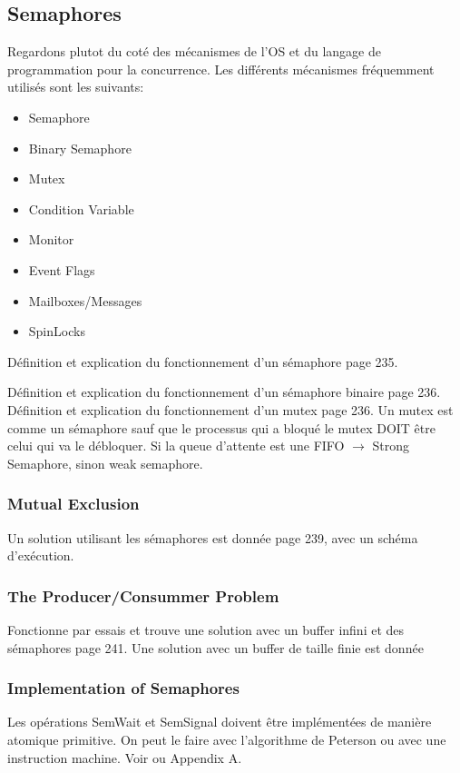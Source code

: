 \subsection{Semaphores}
Regardons plutot du coté des mécanismes de l'OS et du langage de programmation pour la concurrence.
Les différents mécanismes fréquemment utilisés sont les suivants:
\begin{itemize}
  \item Semaphore
  \item Binary Semaphore
  \item Mutex
  \item Condition Variable
  \item Monitor
  \item Event Flags
  \item Mailboxes/Messages
  \item SpinLocks
\end{itemize}
Définition et explication du fonctionnement d'un sémaphore page 235.

Définition et explication du fonctionnement d'un sémaphore binaire page 236.
Définition et explication du fonctionnement d'un mutex page 236.
Un mutex est comme un sémaphore sauf que le processus qui a bloqué le mutex DOIT être celui qui va le débloquer.
Si la queue d'attente est une FIFO $\to$ Strong Semaphore, sinon weak semaphore.

\subsubsection{Mutual Exclusion}
Un solution utilisant les sémaphores est donnée page 239, avec un schéma d'exécution.

\subsubsection{The Producer/Consummer Problem}
Fonctionne par essais et trouve une solution avec un buffer infini et des sémaphores page 241.
Une solution avec un buffer de taille finie est donnée \cite[p.~243]{stallings}

\subsubsection{Implementation of Semaphores}
Les opérations SemWait et SemSignal doivent être implémentées de manière atomique primitive.
On peut le faire avec l'algorithme de Peterson ou avec une instruction machine.
Voir \cite[p.~245]{stallings} ou Appendix A.

